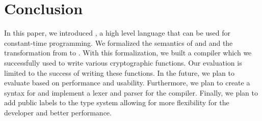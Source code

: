 \section{Conclusion}
In this paper, we introduced \constc, a high level language that can be used for constant-time programming. We formalized the semantics of \constc and \ccore and the transformation from \constc to \ccore. With this formalization, we built a \constc compiler which we successfully used to write various cryptographic functions. Our evaluation is limited to the success of writing these functions. In the future, we plan to evaluate \constc based on performance and usability. Furthermore, we plan to create a syntax for \constc and implement a lexer and parser for the compiler. Finally, we plan to add public labels to the type system allowing for more flexibility for the developer and better performance.
